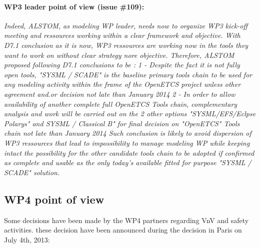 \paragraph{WP3 leader point of view (issue \#109):}
\emph{Indeed, ALSTOM, as modeling WP leader, needs now to organize WP3 kick-off meeting and ressources working within a clear framework and objective. With D7.1 conclusion as it is now, WP3 ressources are working now in the tools they want to work on without clear strategy nore objective.
Therefore, ALSTOM proposed following D7.1 conclusions to be :
1 - Despite the fact it is not fully open tools, "SYSML / SCADE" is the baseline primary tools chain to be used for any modeling activity within the frame of the OpenETCS project unless other agreement and.or decision not late than January 2014
2 - In order to allow availability of another complete full OpenETCS Tools chain, complementary analysis and work will be carried out on the 2 other options "SYSML/EFS/Eclpse Polarys" and SYSML / Classical B" for final decision on "OpenETCS" Tools chain not late than January 2014
Such conclusion is likely to avoid dispersion of WP3 ressources that lead to impossibility to manage modeling WP while keeping intact the possibility for the other candidate tools chain to be adopted if confirmed as complete and usable as the only today's available fitted for purpose "SYSML / SCADE" solution.}


\subsection{WP4 point of view}

Some decisions have been made by the WP4 partners regarding VnV and safety activities. these decision have been announced during the decision in Paris on July 4th, 2013:




